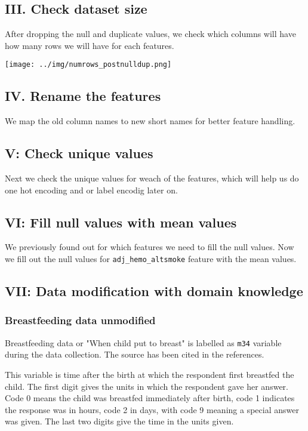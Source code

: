 \subsection{III. Check dataset size}
After dropping the null and duplicate values, we check which columns will have how many rows we will have for each features.

\texttt{[image: ../img/numrows\_postnulldup.png]}

\subsection{IV. Rename the features}
We map the old column names to new short names for better feature handling.

\subsection{V: Check unique values}
Next we check the unique values for weach of the features, which will help us do one hot encoding and or label encodig later on.


\subsection{VI: Fill null values with mean values}
We previously found out for which features we need to fill the null values. Now we fill out the null values for \texttt{adj\_hemo\_altsmoke} feature with the mean values.



\subsection{VII: Data modification with domain knowledge}
\subsubsection{Breastfeeding data unmodified}

Breastfeeding data or "When child put to breast" is labelled as \texttt{m34} variable during the data collection. The source has been cited in the references.

This variable is time after the birth at which the respondent first breastfed the child. The first digit gives the units in which the respondent gave her answer. Code 0 means the child was breastfed immediately after birth, code 1 indicates the response was in hours, code 2 in days, with code 9 meaning a special answer was given. The last two digits give the time in the units given.

